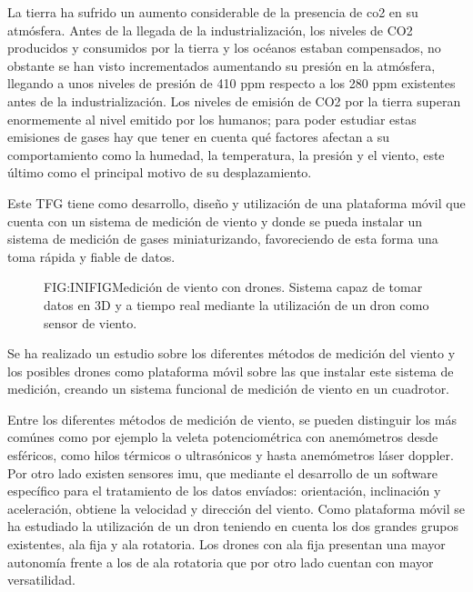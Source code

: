 

La tierra ha sufrido un aumento considerable de la presencia de \ac{co2} en su atmósfera. Antes de la llegada de la industrialización, los niveles de CO2 producidos y consumidos por la tierra y los océanos estaban compensados, no obstante se han visto incrementados aumentando su presión en la atmósfera, llegando a unos niveles de presión de 410 \ac{ppm} respecto a los 280 ppm existentes antes de la industrialización\cite{Hansen1998}\cite{co2atmo}. Los niveles de emisión de CO2 por la tierra superan enormemente al nivel emitido por los humanos; para poder estudiar estas emisiones de gases hay que tener en cuenta qué factores afectan a su comportamiento como la humedad, la temperatura, la presión y el viento, este último como el principal motivo de su desplazamiento.

Este TFG tiene como desarrollo, diseño y utilización de una plataforma móvil que cuenta con un sistema de medición de viento y donde se pueda instalar un sistema de medición de gases miniaturizando, favoreciendo de esta forma una toma rápida y fiable de datos. 

\begin{figure}[Medición de viento con drones]{FIG:INIFIG}{Medición de viento con drones. Sistema capaz de tomar datos en 3D y a tiempo real mediante la utilización de un dron como sensor de viento.}
\end{figure}

Se ha realizado un estudio  sobre los diferentes métodos de medición del viento y los posibles drones como plataforma móvil sobre las que instalar este sistema de medición, creando un sistema funcional de medición de viento en un cuadrotor.

Entre los diferentes métodos de medición de viento, se pueden distinguir los más comúnes como por ejemplo la veleta potenciométrica con anemómetros desde esféricos, como hilos térmicos o ultrasónicos y hasta anemómetros láser doppler. Por otro lado existen sensores \ac{imu}, que mediante el desarrollo de un software específico para el tratamiento de los datos envíados: orientación, inclinación y aceleración, obtiene la velocidad y dirección del viento. Como plataforma móvil se ha estudiado la utilización de un dron teniendo en cuenta los dos grandes grupos existentes, ala fija y ala rotatoria. Los drones con ala fija presentan una mayor autonomía frente a los de ala rotatoria que por otro lado cuentan con mayor versatilidad.



